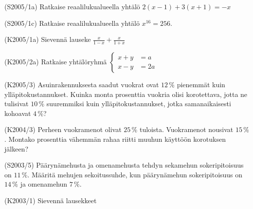 \begin{tehtava}(S2005/1a)  Ratkaise reaalilukualueella yhtälö 
                       $ 2(x - 1) + 3(x + 1 ) = -x $
\end{tehtava}

\begin{tehtava}(S2005/1c)  Ratkaise reaalilukualueella yhtälö $ x^{16} = 256 $.
\end{tehtava}

\begin{tehtava}(K2005/1a)  Sievennä lauseke
                        $ \frac{x}{1 - x} + \frac{x}{1 + x} $
\end{tehtava}

\begin{tehtava}(K2005/2a)  Ratkaise yhtälöryhmä
                      $
                        \left\{
                        \begin{aligned}
                             x + y &= a \\
                             x - y &= 2a
                        \end{aligned}
                        \right.
                    $
\end{tehtava}

\begin{tehtava}(K2005/3)   Asuinrakennuksesta saadut vuokrat ovat $12\,\%$ pienemmät kuin
                        ylläpitokustannukset. Kuinka monta prosenttia vuokria olisi
                        korotettava, jotta ne tulisivat $10\,\%$ suuremmiksi kuin 
                        ylläpitokustannukset, jotka samanaikaisesti kohoavat $4\,\%$?
\end{tehtava}

\begin{tehtava}(K2004/3)   Perheen vuokramenot olivat $25\,\%$ tuloista. Vuokramenot nousivat
                        $15\,\%$. Montako prosenttia vähemmän rahaa riitti muuhun
                        käyttöön korotuksen jälkeen?
\end{tehtava}

\begin{tehtava}(S2003/5)   Päärynämehusta ja omenamehusta tehdyn sekamehun sokeripitoisuus
                        on $11\,\%$. Määritä mehujen sekoitussuhde, kun päärynämehun
                        sokeripitoisuus on $14\,\%$ ja omenamehun $7\,\%$.
\end{tehtava}


\begin{tehtava}(K2003/1)   Sievennä lausekkeet
        \begin{alakohdat}
        \end{alakohdat}
\end{tehtava}

